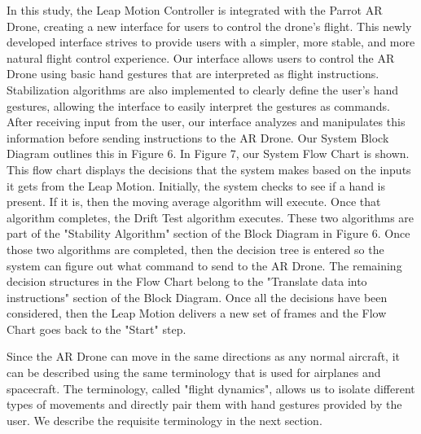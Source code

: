 \documentclass[letterpaper,english, 12pt]{article}
\begin{document}
 
In this study, the Leap Motion Controller is integrated with the Parrot AR Drone, creating a new interface for users to control the drone's flight. This newly developed interface strives to provide users with a simpler, more stable, and more natural flight control experience. Our interface allows users to control the AR Drone using basic hand gestures that are interpreted as flight instructions. Stabilization algorithms are also implemented to clearly define the user's hand gestures, allowing the interface to easily interpret the gestures as commands. After receiving input from the user, our interface analyzes and manipulates this information before sending instructions to the AR Drone. Our System Block Diagram outlines this in Figure 6. In Figure 7, our System Flow Chart is shown. This flow chart displays the decisions that the system makes based on the inputs it gets from the Leap Motion. Initially, the system checks to see if a hand is present. If it is, then the moving average algorithm will execute. Once that algorithm completes, the Drift Test algorithm executes. These two algorithms are part of the "Stability Algorithm" section of the Block Diagram in Figure 6. Once those two algorithms are completed, then the decision tree is entered so the system can figure out what command to send to the AR Drone.  The remaining decision structures in the Flow Chart belong to the "Translate data into instructions" section of the Block Diagram. Once all the decisions have been considered, then the Leap Motion delivers a new set of frames and the Flow Chart goes back to the "Start" step.

Since the AR Drone can move in the same directions as any normal aircraft, it can be described using the same terminology that is used for airplanes and spacecraft. The terminology, called "flight dynamics", allows us to isolate different types of movements and directly pair them with hand gestures provided by the user. We describe the requisite terminology in the next section.
\end{document}
